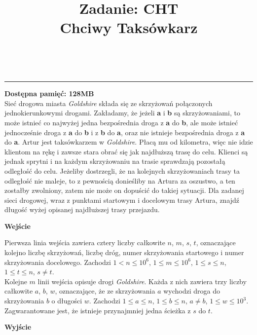 \documentclass{article}
\makeatletter
\renewcommand{\maketitle}{\bgroup\setlength{\parindent}{0pt}
	\textbf{\@title}\egroup
	\\
}
\makeatother
\begin{document}
	\title{\large Zadanie: CHT \\ Chciwy Taksówkarz}\maketitle
	\centering \rule{18cm}{0.5pt} \justifying
	\textbf{Dostępna pamięć: 128MB} \\
	
	Sieć drogowa miasta \textit{Goldshire} składa się ze skrzyżowań połączonych jednokierunkowymi drogami. Zakładamy, że jeżeli \textbf{a} i \textbf{b} są skrzyżowaniami, to może istnieć co najwyżej jedna bezpośrednia droga z \textbf{a} do \textbf{b}, ale może istnieć jednocześnie droga z \textbf{a} do \textbf{b} i z \textbf{b} do \textbf{a}, oraz nie istnieje bezpośrednia droga z \textbf{a} do \textbf{a}.
	\smallbreak
	Artur jest taksówkarzem w \textit{Goldshire}. Płacą mu od kilometra, więc nie idzie klientom na rękę i zawsze stara obrać się jak najdłuższą trasę do celu. Klienci są jednak sprytni i na każdym skrzyżowaniu na trasie sprawdzają pozostałą odległość do celu. Jeżeliby dostrzegli, że na kolejnych skrzyżowaniach trasy ta odległość nie maleje, to z pewnością donieśliby na Artura za oszustwo, a ten zostałby zwolniony, zatem nie może on dopuścić do takiej sytuacji.
	\smallbreak
	Dla zadanej sieci drogowej, wraz z punktami startowym i docelowym trasy Artura, znajdź długość wyżej opisanej najdłuższej trasy przejazdu.
	\begin{flushleft}
		\LARGE \textbf{Wejście}
	\end{flushleft}
	\smallbreak
	
	Pierwsza linia wejścia zawiera cztery liczby całkowite $n$, $m$, $s$, $t$, oznaczające kolejno liczbę skrzyżowań, liczbę dróg, numer skrzyżowania startowego i numer skrzyżowania docelowego. Zachodzi $1 < n \leq 10^6$, $1 \leq m \leq 10^6$, $1 \leq s \leq n$, $1 \leq t \leq n$, $s \neq t$. \\
	Kolejne $m$ linii wejścia opisuje drogi \textit{Goldshire}. Każda z nich zawiera trzy liczby całkowite $a$, $b$, $w$, oznaczające, że ze skrzyżowania $a$ wychodzi droga do skrzyżowania $b$ o długości $w$. Zachodzi $1 \leq a \leq n$, $1 \leq b \leq n$, $a \neq b$, $1 \leq w \leq 10^3$. \\
	Zagwarantowane jest, że istnieje przynajmniej jedna ścieżka z $s$ do $t$.
	\begin{flushleft}
		\LARGE \textbf{Wyjście}
	\end{flushleft}
	\smallbreak
	
\end{document}

